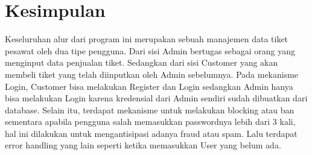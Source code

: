 \documentclass[a4paper,12pt]{article}
\begin{document}
\section{Kesimpulan}
Keseluruhan alur dari program ini merupakan sebuah manajemen data tiket pesawat oleh dua tipe pengguna.
Dari sisi Admin bertugas sebagai orang yang menginput data penjualan tiket. Sedangkan dari sisi Customer yang akan membeli tiket yang telah diinputkan oleh Admin sebelumnya.
Pada mekanisme Login, Customer bisa melakukan Register dan Login sedangkan Admin hanya bisa melakukan Login karena kredensial dari Admin sendiri sudah dibuatkan dari database. Selain itu, terdapat mekanisme untuk melakukan blocking atau ban
sementara apabila pengguna salah memasukkan passwordnya lebih dari 3 kali, hal ini dilakukan untuk mengantisipasi adanya fraud atau spam. Lalu terdapat error handling yang lain seperti ketika memasukkan User yang belum ada.
\end{document}

